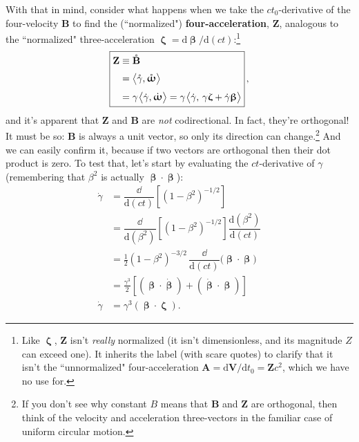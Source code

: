 \documentclass[12pt]{article}
\renewcommand{\vv}[1]{\mathbf{#1}}
\newcommand{\dd}[1]{\mathrm{d}#1}
\newcommand{\vvbeta}{\bm{\upbeta}}
\newcommand{\vvomega}{\bm{\upomega}}
\newcommand{\vvzeta}{\bm{\upzeta}}
\begin{document}
With that in mind, consider what happens when we take the $c t_0$-derivative of the four-velocity $\vv B$ to find the (``normalized") \textbf{four-acceleration}, $\vv Z$, analogous to the ``normalized" three-acceleration $\vvzeta=\dd \vvbeta / \dd (ct)$:\footnote{Like $\vvzeta$, $\vv Z$ isn't \emph{really} normalized (it isn't dimensionless, and its magnitude $Z$ can exceed one). It inherits the label (with scare quotes) to clarify that it isn't the ``unnormalized" four-acceleration $\vv A = \dd \vv V / \dd t_0 = \vv Z c^2$, which we have no use for.}
\begin{equation}\label{eq:34}
\boxed{
\begin{aligned}
\vv Z &\equiv \mathring{\vv B} \\[2pt]
&= \big \langle \mathring{\gamma}, \mathring{\vvomega} \big \rangle \\[3pt]
&= \gamma \mkern1.5mu \big \langle \dot{\gamma}, \dot{\vvomega} \big \rangle = \gamma \mkern1.5mu \big \langle \dot{\gamma}, \, \gamma \vvzeta + \dot{\gamma} \vvbeta \big \rangle
\end{aligned}
} \, ,
\end{equation}
and it's apparent that $\vv Z$ and $\vv B$ are \emph{not} codirectional. In fact, they're orthogonal! It must be so: $\vv B$ is always a unit vector, so only its direction can change.\footnote{If you don't see why constant $B$ means that $\vv B$ and $\vv Z$ are orthogonal, then think of the velocity and acceleration three-vectors in the familiar case of uniform circular motion.} And we can easily confirm it, because if two vectors are orthogonal then their dot product is zero. To test that, let's start by evaluating the $ct$-derivative of $\gamma$ (remembering that $\beta^2$ is actually $\vvbeta \cdot \vvbeta$):
\begin{equation}\label{eq:gd}
\begin{split}
\dot{\gamma} &= \dfrac{\dd}{\dd (ct)} \left[ \left(1-\beta^2 \right)^{-1/2} \right] \\[4pt]
&= \dfrac{\dd}{\dd ( \beta^2 )} \left[ \left( 1 - \beta^2 \right)^{-1/2} \right] \dfrac{\dd (\beta^2)}{\dd (ct)} \\[5pt]
&= \frac{1}{2} \left( 1 - \beta ^2 \right)^{-3/2} \, \dfrac{\dd}{\dd (ct)} \bigl( \vvbeta \cdot \vvbeta \bigr) \\[4pt]
&= \frac{\gamma^3}{2} \left[ ( \vvbeta \cdot \dot{\vvbeta} ) + ( \dot{\vvbeta} \cdot \vvbeta ) \right] \\[5pt]
\dot{\gamma} &= \gamma^3 (\vvbeta \cdot \vvzeta).
\end{split}
\end{equation}
\end{document}
